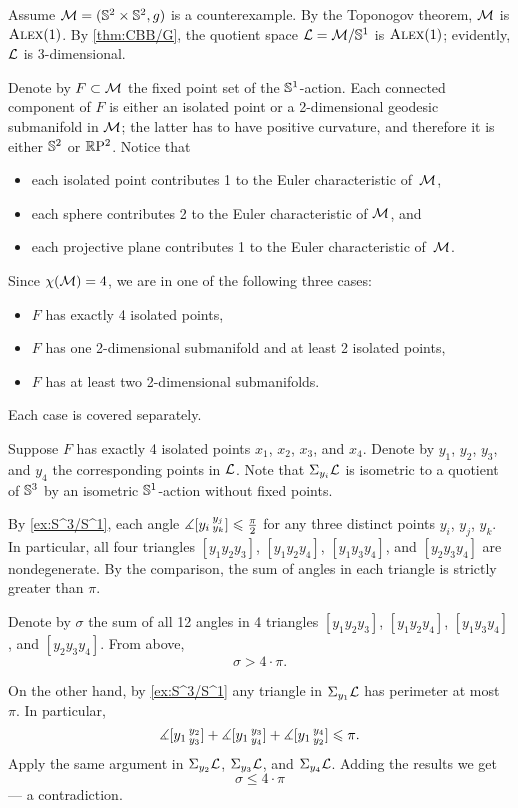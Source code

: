 Assume $\mathcal{M}=(\mathbb{S}^2\times\mathbb{S}^2,g)$ is a counterexample.
By the Toponogov theorem, $\mathcal{M}$ is $\textsc{Alex}(1)$.
By \ref{thm:CBB/G}, the quotient space $\spc{L}\z=\spc{M}/\SSS^1$ is $\textsc{Alex}(1)$;
evidently, $\mathcal{L}$ is 3-dimensional.

Denote by $F\subset \mathcal{M}$ the fixed point set of the $\mathbb{S}^1$-action.
Each connected component of $F$ is either an isolated point or a 2-dimensional geodesic submanifold in $\mathcal{M}$;
the latter has to have positive curvature, and therefore it is either $\mathbb{S}^2$ or $\mathbb{R}\mathrm{P}^2$.
Notice that 
\begin{itemize}
 \item each isolated point contributes 1 to the Euler characteristic of~$\mathcal{M}$,
 \item each sphere contributes 2 to the Euler characteristic of $\mathcal{M}$, and
 \item each projective plane contributes 1 to the Euler characteristic of~$\mathcal{M}$.
\end{itemize}
Since $\chi(\mathcal{M})=4$, we are in one of the following three cases:
\begin{itemize}
 \item $F$ has exactly 4 isolated points,
 \item $F$ has one 2-dimensional submanifold and at least 2 isolated points,
 \item $F$ has at least two 2-dimensional submanifolds.
\end{itemize}
Each case is covered separately.

Suppose $F$ has exactly 4 isolated points $x_1$, $x_2$, $x_3$, and $x_4$.
Denote by $y_1$, $y_2$, $y_3$, and $y_4$ the corresponding points in $\mathcal{L}$.
Note that $\Sigma_{y_i}\mathcal{L}$ is isometric to a quotient of $\mathbb{S}^3$ by an isometric $\mathbb{S}^1$-action without fixed points.

By \ref{ex:S^3/S^1}, each angle $\measuredangle[y_i\,{}^{y_j}_{y_k}]\leqslant \tfrac\pi2$ for any three distinct points 
$y_i$, $y_j$, $y_k$.
In particular, all four triangles $[y_1y_2y_3]$, $[y_1y_2y_4]$, $[y_1y_3y_4]$, and $[y_2y_3y_4]$ are nondegenerate.
By the comparison, the sum of angles in each triangle is strictly greater than $\pi$.

Denote by $\sigma$ the sum of all 12 angles in 4 triangles $[y_1y_2y_3]$, $[y_1y_2y_4]$, $[y_1y_3y_4]$, and $[y_2y_3y_4]$.
From above,
\[\sigma>4\cdot\pi.\]

On the other hand, by \ref{ex:S^3/S^1} any triangle in $\Sigma_{y_1}\mathcal{L}$ has perimeter at most $\pi$.
In particular, 
\[\measuredangle[y_1\,{}^{y_2}_{y_3}]+\measuredangle[y_1\,{}^{y_3}_{y_4}]+\measuredangle[y_1\,{}^{y_4}_{y_2}]\leqslant \pi.\]
Apply the same argument in $\Sigma_{y_2}\mathcal{L}$, $\Sigma_{y_3}\mathcal{L}$, and $\Sigma_{y_4}\mathcal{L}$.
Adding the results we get 
\[\sigma\le 4\cdot\pi\]
--- a contradiction.

